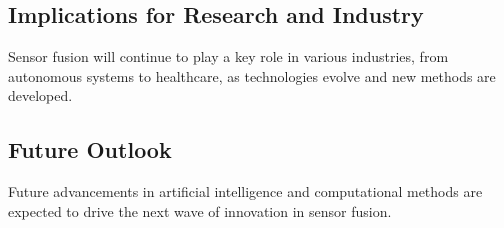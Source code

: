 \documentclass[journal]{IEEEtran}
\begin{document}
\subsection{Implications for Research and Industry}
Sensor fusion will continue to play a key role in various industries, from autonomous systems to healthcare, as technologies evolve and new methods are developed.

\subsection{Future Outlook}
Future advancements in artificial intelligence and computational methods are expected to drive the next wave of innovation in sensor fusion.



\end{document}
